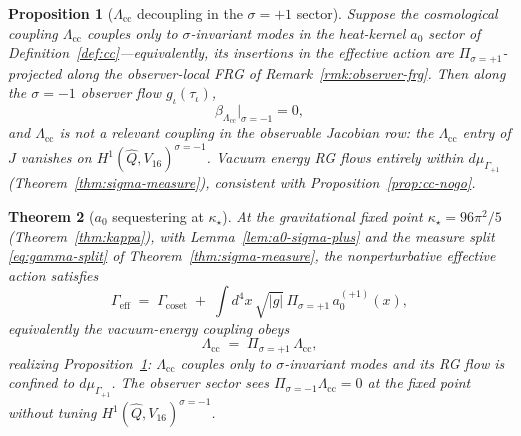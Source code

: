 \documentclass[11pt]{article}
\theoremstyle{plain}
\newtheorem{theorem}{Theorem}[section]
\newtheorem{proposition}[theorem]{Proposition}
\theoremstyle{definition}
\theoremstyle{remark}
\numberwithin{equation}{section}
\begin{document}
\begin{proposition}[$\Lambda_{\mathrm{cc}}$ decoupling in the $\sigma=+1$ sector]
\label{prop:cc-decouple}
Suppose the cosmological coupling $\Lambda_{\mathrm{cc}}$ couples only to
$\sigma$-invariant modes in the heat-kernel $a_0$ sector of
Definition~\ref{def:cc}---equivalently, its insertions in the effective
action are $\Pi_{\sigma=+1}$-projected along the observer-local FRG of
Remark~\ref{rmk:observer-frg}. Then along the $\sigma=-1$ observer flow
$g_\iota(\tau_\iota)$,
\begin{equation}\label{eq:beta-Lambda-decouple}
  \beta_{\Lambda_{\mathrm{cc}}}\Big|_{\sigma=-1}=0,
\end{equation}
and $\Lambda_{\mathrm{cc}}$ is not a relevant coupling in the observable
Jacobian row: the $\Lambda_{\mathrm{cc}}$ entry of $J$ vanishes on
$H^1(\hat Q,V_{16})^{\sigma=-1}$. Vacuum energy RG flows entirely within
$d\mu_{\Gamma_{+1}}$ (Theorem~\ref{thm:sigma-measure}), consistent with
Proposition~\ref{prop:cc-nogo}.
\end{proposition}

\begin{theorem}[$a_0$ sequestering at $\kappa_\star$]
\label{thm:cc-sequester}
At the gravitational fixed point $\kappa_\star=96\pi^2/5$
(Theorem~\ref{thm:kappa}), with Lemma~\ref{lem:a0-sigma-plus} and the
measure split \eqref{eq:gamma-split} of Theorem~\ref{thm:sigma-measure},
the nonperturbative effective action satisfies
\begin{equation}\label{eq:gamma-cc-eff-derived}
  \Gamma_{\mathrm{eff}}
  \;=\;
  \Gamma_{\mathrm{coset}}
  \;+\;
  \int d^4x\,\sqrt{|g|}\,
  \Pi_{\sigma=+1}\,a_0^{(+1)}(x),
\end{equation}
equivalently the vacuum-energy coupling obeys
\begin{equation}\label{eq:a0-sequester}
  \Lambda_{\mathrm{cc}}
  \;=\;
  \Pi_{\sigma=+1}\,\Lambda_{\mathrm{cc}},
\end{equation}
realizing Proposition~\ref{prop:cc-decouple}:
$\Lambda_{\mathrm{cc}}$ couples only to $\sigma$-invariant modes and its RG
flow is confined to $d\mu_{\Gamma_{+1}}$. The observer sector sees
$\Pi_{\sigma=-1}\Lambda_{\mathrm{cc}}=0$ at the fixed point without tuning
$H^1(\hat Q,V_{16})^{\sigma=-1}$.
\end{theorem}
\end{document}
